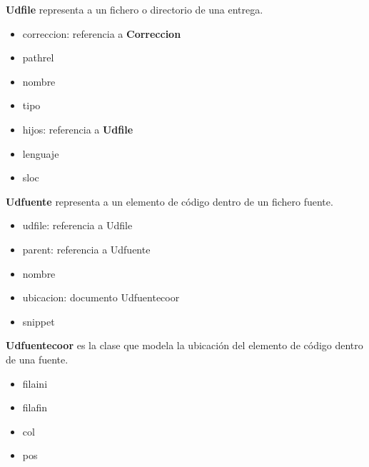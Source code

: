 \begin{description}
\begin{itemize}
\end{itemize}
\item \textbf{Udfile} representa a un fichero o directorio de una entrega.
\begin{itemize}
\item correccion: referencia a \textbf{Correccion}
\item pathrel
\item nombre
\item tipo
\item hijos: referencia a \textbf{Udfile}
\item lenguaje
\item sloc
\end{itemize}
\item \textbf{Udfuente} representa a un elemento de código dentro de un fichero fuente.
\begin{itemize}
\item udfile: referencia a Udfile
\item parent: referencia a Udfuente
\item nombre
\item ubicacion: documento Udfuentecoor
\item snippet
\end{itemize}
\item \textbf{Udfuentecoor} es la clase que modela la ubicación del elemento de código dentro de una fuente.
\begin{itemize}
\item filaini
\item filafin
\item col
\item pos
\end{itemize}


\end{description}
